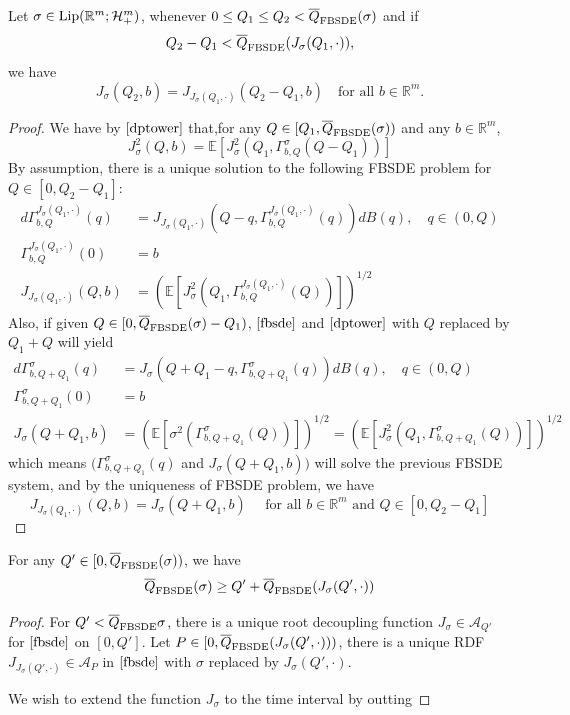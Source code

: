 \begin{lemma}
    Let $\sigma \in \text{Lip}(\mathbb{R}^m;\mathcal{H}^m_+)$, whenever $0\leq Q_1\leq Q_2 < \overline{Q}_{\text{FBSDE}}(\sigma)$ and if
    \[
    Q_2 - Q_1 < \overline{Q}_{\text{FBSDE}}(J_{\sigma}(Q_1,\cdot)),
    \]
    we have
    \[
    J_{\sigma}(Q_2,b) = J_{J_{\sigma}(Q_1,\cdot)}(Q_2-Q_1,b)\quad\text{for all }b\in\mathbb{R}^m.
    \]
\end{lemma}
\begin{proof}
    We have by $\eqref{dptower}$ that,for any $Q\in [Q_1,\overline{Q}_{\text{FBSDE}}(\sigma))$ and any $b\in\mathbb{R}^m$,
    \[J_{\sigma}^2(Q,b) = \mathbb{E}[J^2_{\sigma}(Q_1,\Gamma^{\sigma}_{b,Q}(Q-Q_1))]\]
    By assumption, there is a unique solution to the following FBSDE problem for $Q\in [0,Q_2-Q_1]$:
    \[
    \begin{aligned}
        d\Gamma^{J_{\sigma}(Q_1,\cdot)}_{b,Q}(q) &= J_{J_{\sigma}(Q_1,\cdot)}(Q-q,\Gamma^{J_{\sigma}(Q_1,\cdot)}_{b,Q}(q))dB(q),\quad q\in(0,Q) \\
        \Gamma^{J_{\sigma}(Q_1,\cdot)}_{b,Q}(0) &= b \\
        J_{J_{\sigma}(Q_1,\cdot)}(Q,b) &= (\mathbb{E}[J_{\sigma}^2(Q_1,\Gamma^{J_{\sigma}(Q_1,\cdot)}_{b,Q}(Q))])^{1/2}
    \end{aligned}
    \]
    Also, if given $Q\in[0,\overline{Q}_{\text{FBSDE}}(\sigma)-Q_1)$, $\eqref{fbsde}$ and $\eqref{dptower}$ with $Q$ replaced by $Q_1+Q$ will yield
    \[
    \begin{aligned}
        d\Gamma^{\sigma}_{b,Q+Q_1}(q) &= J_{\sigma}(Q+Q_1-q,\Gamma^{\sigma}_{b,Q+Q_1}(q))dB(q),\quad q\in(0,Q) \\
        \Gamma^{\sigma}_{b,Q+Q_1}(0) &= b \\
        J_{\sigma}(Q+Q_1,b) &= (\mathbb{E}[\sigma^2(\Gamma^{\sigma}_{b,Q+Q_1}(Q))])^{1/2} = (\mathbb{E}[J_{\sigma}^2(Q_1,\Gamma^{\sigma}_{b,Q+Q_1}(Q))])^{1/2}
    \end{aligned}
    \]
    which means $(\Gamma^{\sigma}_{b,Q+Q_1}(q)$ and $J_{\sigma}(Q+Q_1,b))$ will solve the previous FBSDE system, and by the uniqueness of FBSDE problem, we have
    \[
    J_{J_{\sigma}(Q_1,\cdot)}(Q,b) = J_{\sigma}(Q+Q_1,b)\quad\text{ for all }b\in\mathbb{R}^m\text{ and }Q\in[0,Q_2-Q_1]
    \]
\end{proof}

\begin{proposition}
    For any $Q'\in [0,\overline{Q}_{\text{FBSDE}}(\sigma))$, we have
    \[
    \overline{Q}_{\text{FBSDE}}(\sigma) \geq Q'+\overline{Q}_{\text{FBSDE}}(J_{\sigma}(Q',\cdot))
    \]
\end{proposition}
\begin{proof}
    For $Q' < \overline{Q}_{\text{FBSDE}}{\sigma}$, there is a unique root decoupling function $J_{\sigma} \in \mathcal{A}_{Q'}$ for $\eqref{fbsde}$ on $[0,Q']$. Let $P\in[0,\overline{Q}_{\text{FBSDE}}(J_{\sigma}(Q',\cdot)))$, there is a unique RDF $J_{J_{\sigma}(Q',\cdot)} \in \mathcal{A}_P$ in $\eqref{fbsde}$ with $\sigma$ replaced by $J_{\sigma}(Q',\cdot)$.\par
    We wish to extend the function $J_{\sigma}$ to the time interval by outting 
\end{proof}